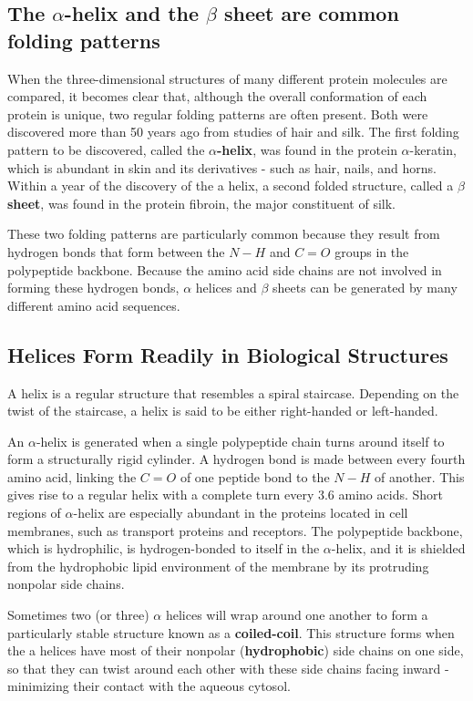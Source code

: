 \subsection{The $\alpha$-helix and the $\beta$ sheet are common folding patterns}

When the three-dimensional structures of many different protein molecules
are compared, it becomes clear that, although the overall
conformation of each protein is unique, two regular folding patterns are
often present. Both were discovered more than 50 years ago from studies
of hair and silk. The first folding pattern to be discovered, called the
\textbf{$\alpha$-helix}, was found in the protein $\alpha$-keratin, which is abundant in skin and
its derivatives - such as hair, nails, and horns. Within a year of the discovery
of the a helix, a second folded structure, called a \textbf{$\beta$ sheet}, was found
in the protein fibroin, the major constituent of silk.

These two folding patterns are particularly common because they result
from hydrogen bonds that form between the $N-H$ and $C=O$ groups in
the polypeptide backbone. Because the amino acid side chains are not
involved in forming these hydrogen bonds, $\alpha$ helices and $\beta$ sheets can
be generated by many different amino acid sequences.

\subsection{Helices Form Readily in Biological Structures}

A helix is a regular structure that resembles a spiral staircase.
Depending on the twist of the staircase, a helix is said to be either
right-handed or left-handed.

An $\alpha$-helix is generated when a single polypeptide chain turns around
itself to form a structurally rigid cylinder. A hydrogen bond is made
between every fourth amino acid, linking the $C=O$ of one peptide bond to
the $N-H$ of another. This gives rise to a regular helix
with a complete turn every 3.6 amino acids.
Short regions of $\alpha$-helix are especially abundant in the proteins located
in cell membranes, such as transport proteins and receptors.
The polypeptide backbone, which is hydrophilic, is hydrogen-bonded to itself in
the $\alpha$-helix, and it is shielded
from the hydrophobic lipid environment of the membrane by its protruding nonpolar side chains.

Sometimes two (or three) $\alpha$ helices will wrap around one another to
form a particularly stable structure known as a \textbf{coiled-coil}. This structure
forms when the a helices have most of their nonpolar (\textbf{hydrophobic})
side chains on one side, so that they can twist around each other with
these side chains facing inward - minimizing their contact with the aqueous cytosol.

